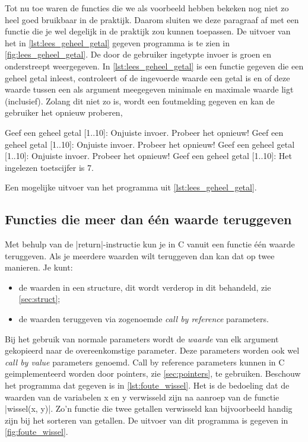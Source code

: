 Tot nu toe waren de functies die we als voorbeeld hebben bekeken nog niet zo heel goed bruikbaar in de praktijk.
Daarom sluiten we deze paragraaf af met een functie die je wel degelijk in de praktijk zou kunnen toepassen.
De uitvoer van het in \cref{lst:lees_geheel_getal} gegeven programma is te zien in \cref{fig:lees_geheel_getal}.
De door de gebruiker ingetypte invoer is groen en onderstreept weergegeven. 
In \cref{lst:lees_geheel_getal} is een functie gegeven die een geheel getal inleest, controleert of de ingevoerde waarde een getal is en of deze waarde tussen een als argument meegegeven minimale en maximale waarde ligt (inclusief).
Zolang dit niet zo is, wordt een foutmelding gegeven en kan de gebruiker het opnieuw proberen,


\begin{myFigure}[!htbp]
	\centering%
	\begin{coutput}
Geef een geheel getal [1..10]: 
Onjuiste invoer. Probeer het opnieuw!
Geef een geheel getal [1..10]: 
Onjuiste invoer. Probeer het opnieuw!
Geef een geheel getal [1..10]: 
Onjuiste invoer. Probeer het opnieuw!
Geef een geheel getal [1..10]: 
Het ingelezen toetscijfer is 7.
	\end{coutput}
	\caption{Een mogelijke uitvoer van het programma uit \cref{lst:lees_geheel_getal}.}
	\label{fig:lees_geheel_getal}
\end{myFigure}

\subsection{Functies die meer dan één waarde teruggeven}
Met behulp van de |return|-instructie kun je in C vanuit een functie één waarde teruggeven.
Als je meerdere waarden wilt teruggeven dan kan dat op twee manieren.
\needspace{2cm}%
Je kunt:
\begin{itemize}
	\item
	de waarden  in een structure, dit wordt verderop in dit \MakeLowercase\documenttype{} behandeld, zie \cref{sec:struct};
	\item
	de waarden teruggeven via zogenoemde \emph{call by reference} parameters.
\end{itemize}

Bij het gebruik van normale parameters wordt de \emph{waarde} van elk argument gekopieerd naar de overeenkomstige parameter. Deze parameters worden ook wel \emph{call by value} parameters genoemd.
Call by reference parameters kunnen in C geimplementeerd worden door pointers, zie \cref{sec:pointers}, te gebruiken.
Beschouw het programma dat gegeven is in \cref{lst:foute_wissel}.
Het is de bedoeling dat de waarden van de variabelen x en y verwisseld zijn na aanroep van de functie |wissel(x, y)|.
Zo'n functie die twee getallen verwisseld kan bijvoorbeeld handig zijn bij het sorteren van getallen.
De uitvoer van dit programma is gegeven in \cref{fig:foute_wissel}.

